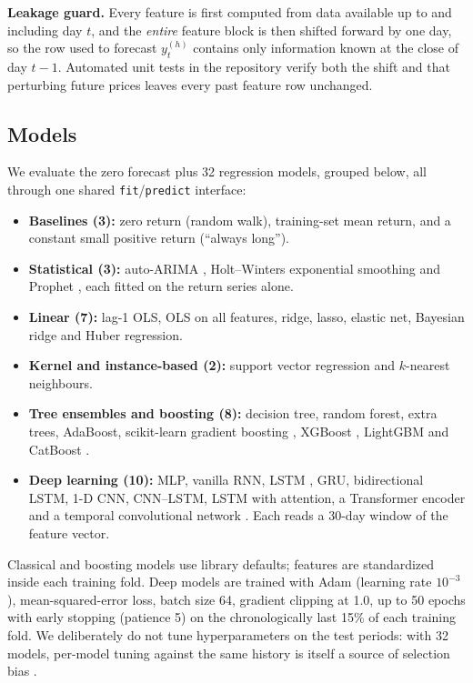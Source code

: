 \textbf{Leakage guard.} Every feature is first computed from data available up to and including day $t$, and the \emph{entire} feature block is then shifted forward by one day, so the row used to forecast $y_t^{(h)}$ contains only information known at the close of day $t-1$. Automated unit tests in the repository verify both the shift and that perturbing future prices leaves every past feature row unchanged.

\subsection{Models}
We evaluate the zero forecast plus 32 regression models, grouped below, all through one shared \texttt{fit}/\texttt{predict} interface:
\begin{itemize}
  \item \textbf{Baselines (3):} zero return (random walk), training-set mean return, and a constant small positive return (``always long'').
  \item \textbf{Statistical (3):} auto-ARIMA \cite{hyndman2008}, Holt--Winters exponential smoothing and Prophet \cite{taylor2018}, each fitted on the return series alone.
  \item \textbf{Linear (7):} lag-1 OLS, OLS on all features, ridge, lasso, elastic net, Bayesian ridge and Huber regression.
  \item \textbf{Kernel and instance-based (2):} support vector regression and $k$-nearest neighbours.
  \item \textbf{Tree ensembles and boosting (8):} decision tree, random forest, extra trees, AdaBoost, scikit-learn gradient boosting \cite{pedregosa2011}, XGBoost \cite{chen2016}, LightGBM \cite{ke2017} and CatBoost \cite{prokhorenkova2018}.
  \item \textbf{Deep learning (10):} MLP, vanilla RNN, LSTM \cite{hochreiter1997}, GRU, bidirectional LSTM, 1-D CNN, CNN--LSTM, LSTM with attention, a Transformer encoder \cite{vaswani2017} and a temporal convolutional network \cite{bai2018}. Each reads a 30-day window of the feature vector.
\end{itemize}
Classical and boosting models use library defaults; features are standardized inside each training fold. Deep models are trained with Adam (learning rate $10^{-3}$), mean-squared-error loss, batch size 64, gradient clipping at 1.0, up to 50 epochs with early stopping (patience 5) on the chronologically last 15\% of each training fold. We deliberately do not tune hyperparameters on the test periods: with 32 models, per-model tuning against the same history is itself a source of selection bias \cite{bailey2014}.

